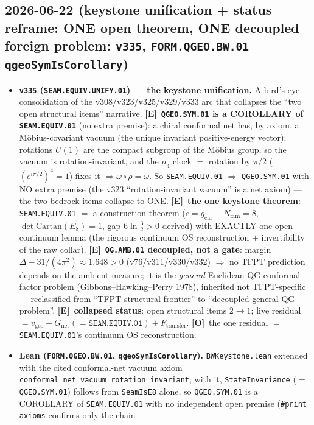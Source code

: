 \documentclass[11pt]{article}
\providecommand{\mE}{\textbf{[E]}}\providecommand{\mC}{\textbf{[C]}}
\providecommand{\mO}{\textbf{[O]}}\providecommand{\mX}{\textbf{[X]}}
\providecommand{\gcar}{g_{\mathrm{car}}}\providecommand{\Nfam}{N_{\mathrm{fam}}}
\begin{document}
\subsection*{2026-06-22 (keystone unification + status reframe: ONE open theorem, ONE decoupled foreign problem: \texttt{v335}, \texttt{FORM.QGEO.BW.01} \texttt{qgeoSymIsCorollary})}
\begin{itemize}
\item \textbf{\texttt{v335} (\texttt{SEAM.EQUIV.UNIFY.01}) --- the keystone unification.} A bird's-eye
consolidation of the v308/v323/v325/v329/v333 arc that collapses the ``two open structural items'' narrative.
\mE\ \textbf{\texttt{QGEO.SYM.01} is a COROLLARY of \texttt{SEAM.EQUIV.01}} (no extra premise): a chiral conformal
net has, by axiom, a M\"obius-covariant vacuum (the unique invariant positive-energy vector); rotations $U(1)$ are
the compact subgroup of the M\"obius group, so the vacuum is rotation-invariant, and the $\mu_4$ clock $=$ rotation
by $\pi/2$ ($(e^{i\pi/2})^4{=}1$) fixes it $\Rightarrow\omega\circ\rho{=}\omega$. So \texttt{SEAM.EQUIV.01}
$\Rightarrow$ \texttt{QGEO.SYM.01} with NO extra premise (the v323 ``rotation-invariant vacuum'' is a net axiom)
--- the two bedrock items collapse to ONE. \mE\ \textbf{the one keystone theorem}: \texttt{SEAM.EQUIV.01} $=$ a
construction theorem ($c{=}\gcar{+}\Nfam{=}8$, $\det\mathrm{Cartan}(E_8){=}1$, gap $6\ln\tfrac32>0$ derived) with
EXACTLY one open continuum lemma (the rigorous continuum OS reconstruction $+$ invertibility of the raw collar).
\mE\ \textbf{\texttt{QG.AMB.01} decoupled, not a gate}: margin $\Delta-31/(4\pi^2)\approx1.648>0$
(v76/v311/v330/v332) $\Rightarrow$ no TFPT prediction depends on the ambient measure; it is the \emph{general}
Euclidean-QG conformal-factor problem (Gibbons--Hawking--Perry 1978), inherited not TFPT-specific --- reclassified
from ``TFPT structural frontier'' to ``decoupled general QG problem''. \mE\ \textbf{collapsed status}: open
structural items $2\to1$; live residual $=v_{\mathrm{geo}}+G_{\mathrm{net}}({=}\texttt{SEAM.EQUIV.01})+
F_{\mathrm{transfer}}$. \mO\ the one residual $=$ \texttt{SEAM.EQUIV.01}'s continuum OS reconstruction.
\item \textbf{Lean (\texttt{FORM.QGEO.BW.01}, \texttt{qgeoSymIsCorollary}).} \texttt{BWKeystone.lean} extended with the
cited conformal-net vacuum axiom \texttt{conformal\_net\_vacuum\_rotation\_invariant}; with it,
\texttt{StateInvariance} ($=$\texttt{QGEO.SYM.01}) follows from \texttt{SeamIsE8} alone, so \texttt{QGEO.SYM.01} is a
COROLLARY of \texttt{SEAM.EQUIV.01} with no independent open premise (\texttt{\#print axioms} confirms only the chain

\end{itemize}
\end{document}
